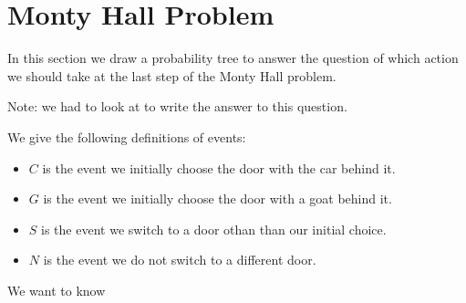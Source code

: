 \documentclass[a4paper,11pt]{article}
\begin{document}
\section{Monty Hall Problem}

In this section we draw a probability tree to answer the question
of which action we should take at the last step of the Monty Hall
problem.


Note: we had to look at \cite{slides3Answers} to write the answer
to this question.

We give the following definitions of events:

\begin{itemize}
\item $C$ is the event we initially choose the door with the car behind
  it.
\item $G$ is the event we initially choose the door with a goat behind
  it.
\item $S$ is the event we switch to a door othan than our 
  initial choice.
\item $N$ is the event we do not switch to a different door.
\end{itemize}


We want to know 
\printbibliography{}
\end{document}
